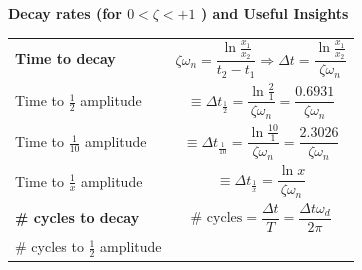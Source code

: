 \documentclass[
]{book}
\begin{document}
\textbf{Decay rates (for \(0 < \zeta < +1\) ) and Useful Insights}

\begin{longtable}[]{@{}ll@{}}
\toprule
\endhead
\begin{minipage}[t]{0.24\columnwidth}\raggedright
\textbf{Time to decay}\strut
\end{minipage} & \begin{minipage}[t]{0.71\columnwidth}\raggedright
\[\zeta \omega_n = \frac{\ln \frac{x_1}{x_2} }{t_2 - t_1} \Rightarrow \Delta t = \frac{\ln \frac{x_1}{x_2}}{\zeta \omega_n} \]\strut
\end{minipage}\tabularnewline
\begin{minipage}[t]{0.24\columnwidth}\raggedright
Time to \(\frac{1}{2}\) amplitude\strut
\end{minipage} & \begin{minipage}[t]{0.71\columnwidth}\raggedright
\[ \equiv \Delta t_{\frac{1}{2}} = \frac{\ln \frac{2}{1}}{\zeta \omega_n} = \frac{0.6931}{\zeta \omega_n}  \]\strut
\end{minipage}\tabularnewline
\begin{minipage}[t]{0.24\columnwidth}\raggedright
Time to \(\frac{1}{10}\) amplitude\strut
\end{minipage} & \begin{minipage}[t]{0.71\columnwidth}\raggedright
\[ \equiv \Delta t_{\frac{1}{10}} = \frac{\ln \frac{10}{1}}{\zeta \omega_n} = \frac{2.3026}{\zeta \omega_n}  \]\strut
\end{minipage}\tabularnewline
\begin{minipage}[t]{0.24\columnwidth}\raggedright
Time to \(\frac{1}{x}\) amplitude\strut
\end{minipage} & \begin{minipage}[t]{0.71\columnwidth}\raggedright
\[ \equiv \Delta t_{\frac{1}{x}} = \frac{\ln x }{\zeta \omega_n}  \]\strut
\end{minipage}\tabularnewline
\begin{minipage}[t]{0.24\columnwidth}\raggedright
\textbf{\# cycles to decay}\strut
\end{minipage} & \begin{minipage}[t]{0.71\columnwidth}\raggedright
\[\text{# cycles} = \frac{\Delta t }{T} = \frac{\Delta t \omega_d}{2 \pi} \]\strut
\end{minipage}\tabularnewline
\begin{minipage}[t]{0.24\columnwidth}\raggedright
\# cycles to \(\frac{1}{2}\) amplitude\strut
\end{minipage} & \begin{minipage}[t]{0.71\columnwidth}\raggedright

\end{minipage}
\end{longtable}
\end{document}

